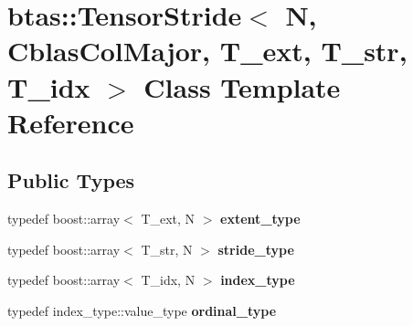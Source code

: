 \hypertarget{classbtas_1_1_tensor_stride_3_01_n_00_01_cblas_col_major_00_01_t__ext_00_01_t__str_00_01_t__idx_01_4}{
\section{btas::TensorStride$<$ N, CblasColMajor, T\_\-ext, T\_\-str, T\_\-idx $>$ Class Template Reference}
\label{classbtas_1_1_tensor_stride_3_01_n_00_01_cblas_col_major_00_01_t__ext_00_01_t__str_00_01_t__idx_01_4}
}
\subsection*{Public Types}
\begin{DoxyCompactItemize}
\item 
\hypertarget{classbtas_1_1_tensor_stride_3_01_n_00_01_cblas_col_major_00_01_t__ext_00_01_t__str_00_01_t__idx_01_4_a57cb3d041eb68d905fdb501ea76ddfa7}{
typedef boost::array$<$ T\_\-ext, N $>$ {\bfseries extent\_\-type}}
\label{classbtas_1_1_tensor_stride_3_01_n_00_01_cblas_col_major_00_01_t__ext_00_01_t__str_00_01_t__idx_01_4_a57cb3d041eb68d905fdb501ea76ddfa7}

\item 
\hypertarget{classbtas_1_1_tensor_stride_3_01_n_00_01_cblas_col_major_00_01_t__ext_00_01_t__str_00_01_t__idx_01_4_a25f4fa3f507cf93f72773d61ee423f9b}{
typedef boost::array$<$ T\_\-str, N $>$ {\bfseries stride\_\-type}}
\label{classbtas_1_1_tensor_stride_3_01_n_00_01_cblas_col_major_00_01_t__ext_00_01_t__str_00_01_t__idx_01_4_a25f4fa3f507cf93f72773d61ee423f9b}

\item 
\hypertarget{classbtas_1_1_tensor_stride_3_01_n_00_01_cblas_col_major_00_01_t__ext_00_01_t__str_00_01_t__idx_01_4_ab35ad669d4142f685b9c03b78b375e27}{
typedef boost::array$<$ T\_\-idx, N $>$ {\bfseries index\_\-type}}
\label{classbtas_1_1_tensor_stride_3_01_n_00_01_cblas_col_major_00_01_t__ext_00_01_t__str_00_01_t__idx_01_4_ab35ad669d4142f685b9c03b78b375e27}

\item 
\hypertarget{classbtas_1_1_tensor_stride_3_01_n_00_01_cblas_col_major_00_01_t__ext_00_01_t__str_00_01_t__idx_01_4_ab8a39eeaed3b5ca1fec4eab1cf44ec3d}{
typedef index\_\-type::value\_\-type {\bfseries ordinal\_\-type}}
\label{classbtas_1_1_tensor_stride_3_01_n_00_01_cblas_col_major_00_01_t__ext_00_01_t__str_00_01_t__idx_01_4_ab8a39eeaed3b5ca1fec4eab1cf44ec3d}

\end{DoxyCompactItemize}
